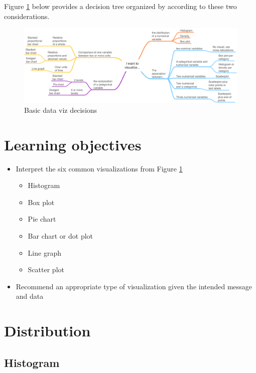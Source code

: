 \documentclass[
]{book}
\providecommand{\tightlist}{%
  \setlength{\itemsep}{0pt}\setlength{\parskip}{0pt}}
\begin{document}
Figure \ref{fig:vizflow} below provides a decision tree organized by according to these two considerations.

\begin{figure}

{\centering \includegraphics[width=\textwidth]{images/vizflow} 

}

\caption{Basic data viz decisions}\label{fig:vizflow}
\end{figure}

\hypertarget{lo5}{%
\section{Learning objectives}\label{lo5}}

\begin{itemize}
\tightlist
\item
  Interpret the six common visualizations from Figure \ref{fig:vizflow}

  \begin{itemize}
  \tightlist
  \item
    Histogram
  \item
    Box plot
  \item
    Pie chart
  \item
    Bar chart or dot plot
  \item
    Line graph
  \item
    Scatter plot
  \end{itemize}
\item
  Recommend an appropriate type of visualization given the intended message and data
\end{itemize}

\hypertarget{distribution}{%
\section{Distribution}\label{distribution}}

\hypertarget{histogram}{%
\subsection{Histogram}\label{histogram}}
\end{document}
